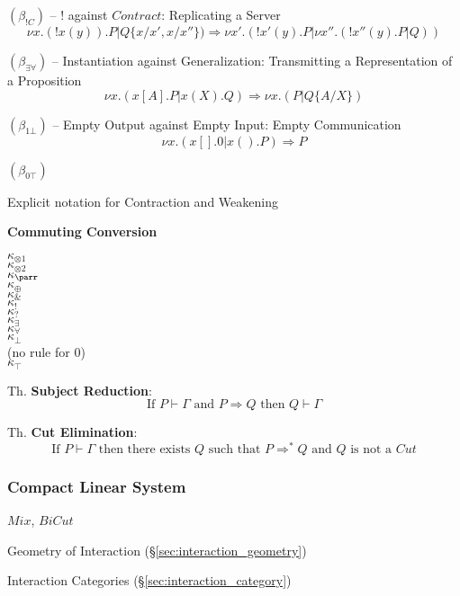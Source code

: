 $(\beta_{! C})$ -- $!$ against $Contract$: Replicating a Server
\[
  \nu x.(!x(y)).P | Q \{x/x', x/x''\}) \Longrightarrow
    \nu x'.(!x'(y).P | \nu x''.(!x''(y).P | Q))
\]

$(\beta_{\exists \forall})$ -- Instantiation against Generalization:
Transmitting a Representation of a Proposition
\[
  \nu x.(x[A].P | x(X).Q) \Longrightarrow \nu x.(P|Q\{A/X\})
\]

$(\beta_{1 \bot})$ -- Empty Output against Empty Input: Empty
Communication
\[
  \nu x.(x[].0 | x().P) \Longrightarrow P
\]

$(\beta_{0 \top})$


Explicit notation for Contraction and Weakening %


\textbf{Commuting Conversion}

$\kappa_{\otimes 1}$ \\
$\kappa_{\otimes 2}$ \\
$\kappa_\parr$ \\
$\kappa_\oplus$ \\
$\kappa_\&$ \\
$\kappa_!$ \\
$\kappa_?$ \\
$\kappa_\exists$ \\
$\kappa_\forall$ \\
$\kappa_\bot$ \\
(no rule for $0$) \\
$\kappa_\top$


Th. \textbf{Subject Reduction}:
\[
  \text{If } P \vdash \Gamma \text{ and } P \Longrightarrow Q
  \text{ then } Q \vdash \Gamma
\]

Th. \textbf{Cut Elimination}:
\[
  \text{If } P \vdash \Gamma \text{ then there exists } Q
  \text{ such that } P \Longrightarrow^* Q \text{ and } Q
  \text{ is not a } Cut
\]



\subsubsection{Compact Linear System}\label{sec:compact_linear_system}

\cite{abramsky-gay-nagarajan96}

$Mix$, $BiCut$

\cite{wadler12}

Geometry of Interaction (\S\ref{sec:interaction_geometry})

Interaction Categories (\S\ref{sec:interaction_category})



